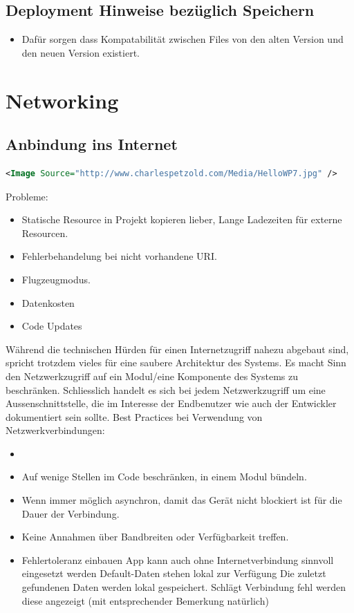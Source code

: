 \documentclass[a4paper,10pt]{scrreprt}
\begin{document}
\section{Deployment Hinweise bezüglich Speichern}
\begin{itemize}
 \item Dafür sorgen dass Kompatabilität zwischen Files von den alten Version und den neuen Version existiert.
\end{itemize}

\chapter{Networking}

\section{Anbindung ins Internet}
\begin{lstlisting}[language=xml]
 <Image Source="http://www.charlespetzold.com/Media/HelloWP7.jpg" />
\end{lstlisting}

Probleme:
\begin{itemize}
 \item Statische Resource in Projekt kopieren lieber, Lange Ladezeiten für externe Resourcen.
 \item Fehlerbehandelung bei nicht vorhandene URI.
 \item Flugzeugmodus.
 \item Datenkosten
 \item Code Updates
\end{itemize}

Während die technischen Hürden für einen Internetzugriff nahezu abgebaut sind, spricht trotzdem vieles für
eine saubere Architektur des Systems. Es macht Sinn den Netzwerkzugriff auf ein Modul/eine Komponente des
Systems zu beschränken. Schliesslich handelt es sich bei jedem Netzwerkzugriff um eine Aussenschnittstelle, die
im Interesse der Endbenutzer wie auch der Entwickler dokumentiert sein sollte.
Best Practices bei Verwendung von Netzwerkverbindungen:
\begin{itemize}
 \item
\item Auf wenige Stellen im Code beschränken, in einem Modul bündeln.
\item Wenn immer möglich asynchron, damit das Gerät nicht blockiert ist für die Dauer der Verbindung.
\item Keine Annahmen über Bandbreiten oder Verfügbarkeit treffen.
\item Fehlertoleranz einbauen
\subitem  App kann auch ohne Internetverbindung sinnvoll eingesetzt werden
\subitem  Default-Daten stehen lokal zur Verfügung
\subitem Die zuletzt gefundenen Daten werden lokal gespeichert. Schlägt Verbindung fehl werden diese
angezeigt (mit entsprechender Bemerkung natürlich)
\end{itemize}
\end{document}
